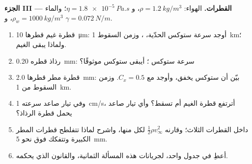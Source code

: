 \begin{problem}
\medskip
\noindent\textbf{الجزء III --- القطرات.}
الهواء: $\rho = \qty{1.2}{kg/m^3}$، و $\eta = \qty{1.8e-5}{Pa.s}$؛ والماء $\rho_w =
\qty{1000}{kg/m^3}$، و $\gamma = \qty{0.072}{N/m}$.
\begin{enumerate}[resume]
  \item قطرة غيم قطرها \qty{10}{\micro m}: أوجد سرعة ستوكس الحدّية،
        ، وزمن السقوط \qty{1}{km}؛ ولماذا يبقى الغيم.
  \item رذاذ قطره \qty{0.20}{mm}: سرعة ستوكس ؛ أيبقى
        ستوكس موثوقًا؟
  \item قطرة مطر قطرها \qty{2.0}{mm}: بيّن أن ستوكس يخفق، وأوجد
         مع $C_x = 0.5$. وزمن السقوط من \qty{1}{km}.
  \item وفي تيار صاعد سرعته \qty{1}{cm/s}، أترتفع قطرة الغيم أم
        تسقط؟ وأي تيار صاعد يحمل قطرة الرذاذ؟
  \item {} داخل القطرات الثلاث؛ وقارنه  $\tfrac12\rho v_\infty^2$ لكل منها، واشرح لماذا
        تتفلطح قطرات المطر الكبيرة وتتفكك فوق نحو \qty{5}{mm}.
  \item أعطِ في جدول واحد، لجريانات هذه المسألة الثمانية،  والقانون الذي يحكمه.
\end{enumerate}
\end{problem}
